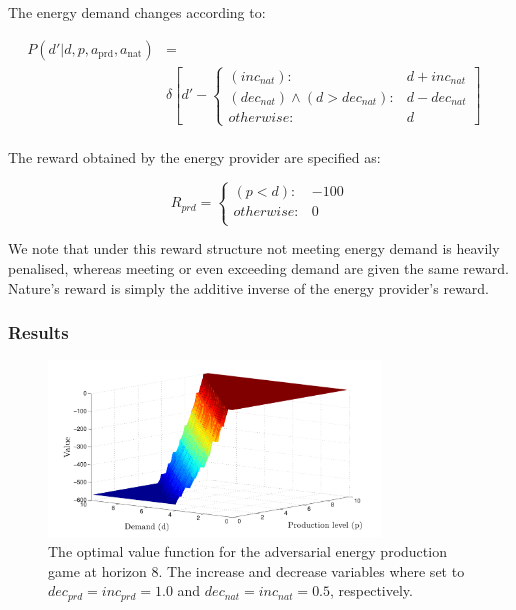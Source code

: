 The energy demand changes according to:

{\tiny 
\begin{align*}
P(d' | d, p, a_{\text{prd}}, a_{\text{nat}}) &= \\
&
\delta \left[ d' - \begin{cases}
      (inc_{nat})  : & d + inc_{nat} \\
       (dec_{nat}) \wedge (d > dec_{nat}) : & d - dec_{nat} \\
      otherwise: & d
    \end{cases} \right] & \\    
\end{align*}
}%

The reward obtained by the energy provider are specified as:

{\small 
\begin{equation}
  R_{prd} = 
    \begin{cases}
      (p < d) : & -100 \\ 
      otherwise : & 0 \\ 
    \end{cases} \nonumber
\end{equation}
}%

We note that under this reward structure not meeting energy demand
is heavily penalised, whereas meeting or even exceeding demand are
given the same reward. Nature's reward is simply the additive inverse 
of the energy provider's reward.

\subsubsection{Results}


\begin{figure}[ht!]
\includegraphics[width=250pt]{sep.pdf}
\vspace{-3mm}
\caption{The optimal value function for the adversarial energy production game at horizon 8. 
The increase and decrease variables where set to $dec_{prd} = inc_{prd} = 1.0$ and $dec_{nat} = inc_{nat} = 0.5$, respectively.}
\label{fig:sepvfunc}
\end{figure}

